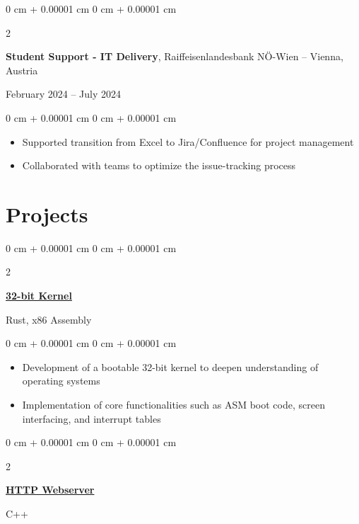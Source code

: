 \documentclass[10pt, letterpaper]{article}
\newenvironment{highlights}{
    \begin{itemize}[
        topsep=0.10 cm,
        parsep=0.10 cm,
        partopsep=0pt,
        itemsep=0pt,
        leftmargin=0 cm + 10pt
    ]
}{
    \end{itemize}
}
\newenvironment{onecolentry}{
    \begin{adjustwidth}{
        0 cm + 0.00001 cm
    }{
        0 cm + 0.00001 cm
    }
}{
    \end{adjustwidth}
}
\newenvironment{twocolentry}[2][]{
    \onecolentry
    \def\secondColumn{#2}
    \setcolumnwidth{\fill, 4.5 cm}
    \begin{paracol}{2}
}{
    \switchcolumn \raggedleft \secondColumn
    \end{paracol}
    \endonecolentry
}
\begin{document}
    \vspace{0.2 cm}

    \begin{twocolentry}
        {February 2024 – July 2024}
        \textbf{Student Support - IT Delivery}, Raiffeisenlandesbank NÖ-Wien -- Vienna, Austria
    \end{twocolentry}

    \vspace{0.10 cm}

    \begin{onecolentry}
        \begin{highlights}
            \item Supported transition from Excel to Jira/Confluence for project management
            \item Collaborated with teams to optimize the issue-tracking process
        \end{highlights}
    \end{onecolentry}

    \section{Projects}
        
    \begin{twocolentry}
        {Rust, x86 Assembly}
        \href{https://github.com/kentucky-fried-kernel/kfs}{\textbf{32-bit Kernel}}
    \end{twocolentry}

    \vspace{0.10 cm}
    
    \begin{onecolentry}
        \begin{highlights}
            \item Development of a bootable 32-bit kernel to deepen understanding of operating systems  
            \item Implementation of core functionalities such as ASM boot code, screen interfacing, and interrupt tables
        \end{highlights}
    \end{onecolentry}


    \vspace{0.2 cm}

    \begin{twocolentry}
        {C++}
        \href{https://github.com/winstonallo/webserv}{\textbf{HTTP Webserver}}
    \end{twocolentry}
\end{document}
